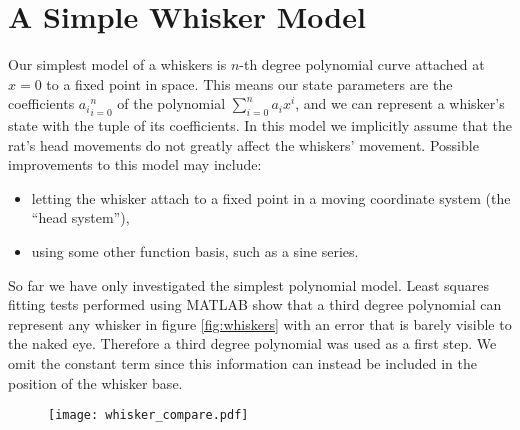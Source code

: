 \section*{A Simple Whisker Model}

Our simplest model of a whiskers is $n$-th degree polynomial curve attached at $x=0$ to a fixed point in space. This means our state parameters are the coefficients ${a_i}_{i=0}^n$ of the polynomial $\sum_{i=0}^n a_ix^i$, and we can represent a whisker's state with the tuple of its coefficients. In this model we implicitly assume that the rat's head movements do not greatly affect the whiskers' movement. Possible improvements to this model may include:
\begin{itemize}
  \item letting the whisker attach to a fixed point in a moving coordinate system (the ``head system''),
  \item using some other function basis, such as a sine series.
\end{itemize}

So far we have only investigated the simplest polynomial model. Least squares fitting tests performed using MATLAB show that a third degree polynomial can represent any whisker in figure \ref{fig:whiskers} with an error that is barely visible to the naked eye. Therefore a third degree polynomial was used as a first step. We omit the constant term since this information can instead be included in the position of the whisker base.

\begin{figure}
  \centering
  \texttt{[image: whisker\_compare.pdf]}
\end{figure}
